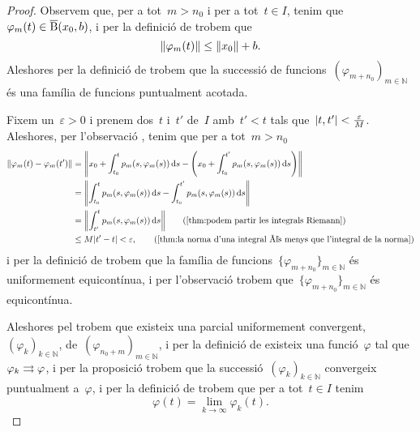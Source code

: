 \documentclass[../../Main.tex]{subfiles}
\begin{document}
\begin{theorem}
\begin{proof}
			Observem que, per a tot~\(m>n_{0}\) i per a tot~\(t\in I\), tenim que~\(\varphi_{m}(t)\in\overline{\operatorname{B}}(x_{0},b)\), i per la definició de  trobem que
			\[
			    \norm{\varphi_{m}(t)}\leq\norm{x_{0}}+b.
			\]
			Aleshores per la definició de  trobem que la successió de funcions~\((\varphi_{m+n_{0}})_{m\in\mathbb{N}}\) és una família de funcions puntualment acotada.

			Fixem un~\(\varepsilon>0\) i prenem dos~\(t\) i~\(t'\) de~\(I\) amb~\(t'<t\) tals que~\(\abs{t,t'}<\frac{\varepsilon}{M}\).
			Aleshores, per l'observació , tenim que per a tot~\(m>n_{0}\)
			\begin{align*}
				\norm{\varphi_{m}(t)-\varphi_{m}(t')}&=\norm{x_{0}+\int_{t_{0}}^{t}p_{m}(s,\varphi_{m}(s))\diff s-\Bigg(x_{0}+\int_{t_{0}}^{t'}p_{m}(s,\varphi_{m}(s))\diff s\Bigg)} \\
				&=\norm{\int_{t_{0}}^{t}p_{m}(s,\varphi_{m}(s))\diff s-\int_{t_{0}}^{t'}p_{m}(s,\varphi_{m}(s))\diff s} \\
				&=\norm{\int_{t'}^{t}p_{m}(s,\varphi_{m}(s))\diff s} \tag{\ref{thm:podem partir les integrals Riemann}} \\
				&\leq M\abs{t'-t}<\varepsilon, \tag{\ref{thm:la norma d'una integral és menys que l'integral de la norma}}
			\end{align*}
			i per la definició de  trobem que la família de funcions~\(\{\varphi_{m+n_{0}}\}_{m\in\mathbb{N}}\) és uniformement equicontínua, i per l'observació  trobem que~\(\{\varphi_{m+n_{0}}\}_{m\in\mathbb{N}}\) és equicontínua.

			Aleshores pel  trobem que existeix una parcial uniformement convergent,~\((\varphi_{k})_{k\in\mathbb{N}}\), de~\((\varphi_{n_{0}+m})_{m\in\mathbb{N}}\), i per la definició de  existeix una funció~\(\varphi\) tal que~\(\varphi_{k}\mathrel{\rightrightarrows}\varphi\), i per la proposició  trobem que la successió~\((\varphi_{k})_{k\in\mathbb{N}}\) convergeix puntualment a~\(\varphi\), i per la definició de  trobem que per a tot~\(t\in I\) tenim
			\begin{equation}
				\label{thm:Teorema de Peano:eq1}
				\varphi(t)=\lim_{k\to\infty}\varphi_{k}(t).
			\end{equation}


\end{proof}
\end{theorem}
\end{document}
